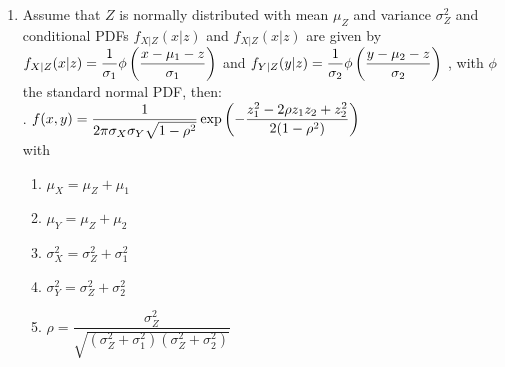 \begin{enumerate}
    \item Assume that $Z$ is normally distributed with mean $\mu_Z$ and variance $\sigma^2_Z$ and conditional PDFs $f_{X|Z} (x|z)$ and $f_{X|Z} (x|z)$ are given by $f_{X|Z} (x|z) = \dfrac{1}{\sigma_1} \phi\left(\dfrac{x - \mu_1 - z}{\sigma_1}\right)$ and $f_{Y |Z} (y|z) = \dfrac{1}{\sigma_2} \phi\left(\dfrac{y - \mu_2 - z}{\sigma_2}\right)$ , with $\phi$ the standard normal PDF, then:
    \hfill \cite{statistics/book/Statistics-for-Data-Scientists/Maurits-Kaptein}
    \\
    .\hfill
    $
        f (x, y) 
        = \dfrac{1}{ 2\pi\sigma_X \sigma_Y \sqrt{1 - \rho^2} }
        \exp \left(
            - \dfrac{z^2_1 - 2\rho z_1z_2 + z^2_2 }{2(1 - \rho^2)}
        \right)
    $
    \hfill \cite{statistics/book/Statistics-for-Data-Scientists/Maurits-Kaptein}
    \\
    with
    \begin{multicols}{2}
    \begin{enumerate}
        \item $\mu_X = \mu_Z + \mu_1$
        \hfill \cite{statistics/book/Statistics-for-Data-Scientists/Maurits-Kaptein}
        
        \item $\mu_Y = \mu_Z + \mu_2$
        \hfill \cite{statistics/book/Statistics-for-Data-Scientists/Maurits-Kaptein}
        
        \item $\sigma^2_X = \sigma^2_Z + \sigma^2_1$
        \hfill \cite{statistics/book/Statistics-for-Data-Scientists/Maurits-Kaptein}
        
        \item $\sigma^2_Y = \sigma^2_Z + \sigma^2_2$
        \hfill \cite{statistics/book/Statistics-for-Data-Scientists/Maurits-Kaptein}

        \item $\rho = \dfrac{\sigma^2_Z }{\sqrt{(\sigma^2_Z + \sigma^2_1 )(\sigma^2_Z + \sigma^2_2 )}}$
        \hfill \cite{statistics/book/Statistics-for-Data-Scientists/Maurits-Kaptein}
    \end{enumerate}
    \end{multicols}
\end{enumerate}













